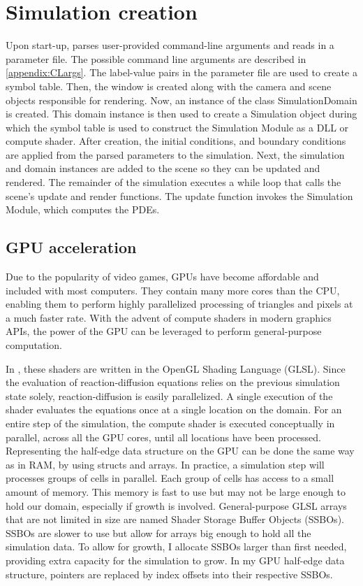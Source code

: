 \section{Simulation creation}
Upon start-up, \ProgramName{} parses user-provided command-line arguments and reads in a parameter file. The possible command line arguments are described in \ref{appendix:CLargs}. The label-value pairs in the parameter file are used to create a symbol table. Then, the window is created along with the camera and scene objects responsible for rendering. Now, an instance of the class SimulationDomain is created. This domain instance is then used to create a Simulation object during which the symbol table is used to construct the Simulation Module as a DLL or compute shader. After creation, the initial conditions, and boundary conditions are applied from the parsed parameters to the simulation. Next, the simulation and domain instances are added to the scene so they can be updated and rendered. The remainder of the simulation executes a while loop that calls the scene's update and render functions. The update function invokes the Simulation Module, which computes the PDEs.

\subsection{GPU acceleration}
Due to the popularity of video games, GPUs have become affordable and included with most computers. They contain many more cores than the CPU, enabling them to perform highly parallelized processing of triangles and pixels at a much faster rate. With the advent of compute shaders in modern graphics APIs, the power of the GPU can be leveraged to perform general-purpose computation. 

In \ProgramName{}, these shaders are written in the OpenGL Shading Language (GLSL). Since the evaluation of reaction-diffusion equations relies on the previous simulation state solely, reaction-diffusion is easily parallelized. A single execution of the shader evaluates the equations once at a single location on the domain. For an entire step of the simulation, the compute shader is executed conceptually in parallel, across all the GPU cores, until all locations have been processed. Representing the half-edge data structure on the GPU can be done the same way as in RAM, by using structs and arrays. In practice, a simulation step will processes groups of cells in parallel. Each group of cells has access to a small amount of memory. This memory is fast to use but may not be large enough to hold our domain, especially if growth is involved. General-purpose GLSL arrays that are not limited in size are named Shader Storage Buffer Objects (SSBOs). SSBOs are slower to use but allow for arrays big enough to hold all the simulation data. To allow for growth, I allocate SSBOs larger than first needed, providing extra capacity for the simulation to grow. In my GPU half-edge data structure, pointers are replaced by index offsets into their respective SSBOs.

